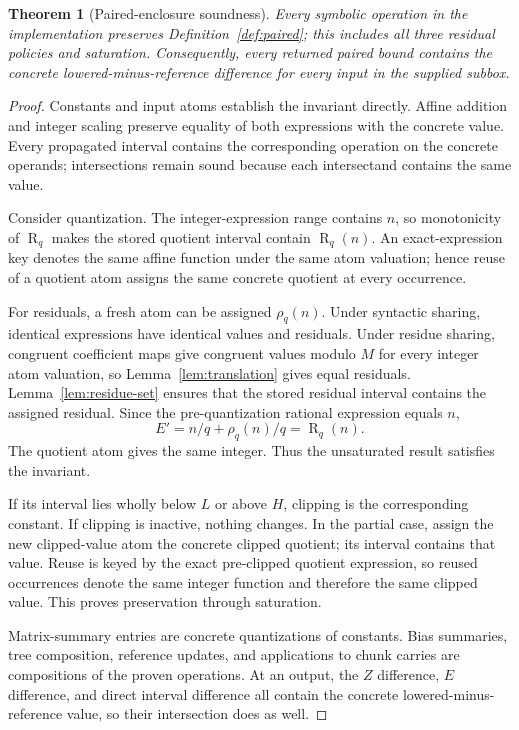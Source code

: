\documentclass[11pt]{article}
\newtheorem{theorem}[definition]{Theorem}
\newcommand{\R}{\operatorname{R}}
\begin{document}
\begin{theorem}[Paired-enclosure soundness]\label{thm:paired}
Every symbolic operation in the implementation preserves Definition~\ref{def:paired}; this includes all three residual policies and saturation. Consequently, every returned paired bound contains the concrete lowered-minus-reference difference for every input in the supplied subbox.
\end{theorem}
\begin{proof}
Constants and input atoms establish the invariant directly. Affine addition and integer scaling preserve equality of both expressions with the concrete value. Every propagated interval contains the corresponding operation on the concrete operands; intersections remain sound because each intersectand contains the same value.

Consider quantization. The integer-expression range contains $n$, so monotonicity of $\R_q$ makes the stored quotient interval contain $\R_q(n)$. An exact-expression key denotes the same affine function under the same atom valuation; hence reuse of a quotient atom assigns the same concrete quotient at every occurrence.

For residuals, a fresh atom can be assigned $\rho_q(n)$. Under syntactic sharing, identical expressions have identical values and residuals. Under residue sharing, congruent coefficient maps give congruent values modulo $M$ for every integer atom valuation, so Lemma~\ref{lem:translation} gives equal residuals. Lemma~\ref{lem:residue-set} ensures that the stored residual interval contains the assigned residual. Since the pre-quantization rational expression equals $n$,
\[
  E'=n/q+\rho_q(n)/q=\R_q(n).
\]
The quotient atom gives the same integer. Thus the unsaturated result satisfies the invariant.

If its interval lies wholly below $L$ or above $H$, clipping is the corresponding constant. If clipping is inactive, nothing changes. In the partial case, assign the new clipped-value atom the concrete clipped quotient; its interval contains that value. Reuse is keyed by the exact pre-clipped quotient expression, so reused occurrences denote the same integer function and therefore the same clipped value. This proves preservation through saturation.

Matrix-summary entries are concrete quantizations of constants. Bias summaries, tree composition, reference updates, and applications to chunk carries are compositions of the proven operations. At an output, the $Z$ difference, $E$ difference, and direct interval difference all contain the concrete lowered-minus-reference value, so their intersection does as well.
\end{proof}
\end{document}
